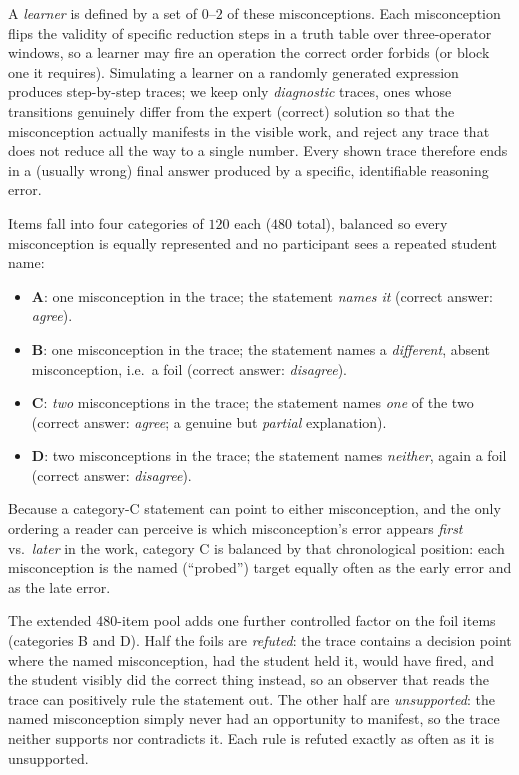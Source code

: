 \documentclass[11pt]{article}
\begin{document}
A \emph{learner} is defined by a set of $0$--$2$ of these misconceptions. Each misconception
flips the validity of specific reduction steps in a truth table over three-operator windows,
so a learner may fire an operation the correct order forbids (or block one it requires).
Simulating a learner on a randomly generated expression produces step-by-step traces; we keep
only \emph{diagnostic} traces, ones whose transitions genuinely differ from the expert
(correct) solution so that the misconception actually manifests in the visible work, and reject
any trace that does not reduce all the way to a single number. Every shown trace therefore
ends in a (usually wrong) final answer produced by a specific, identifiable reasoning error.

Items fall into four categories of $120$ each ($480$ total), balanced so every misconception is
equally represented and no participant sees a repeated student name:
\begin{itemize}
\item \textbf{A}: one misconception in the trace; the statement \emph{names it}
      (correct answer: \emph{agree}).
\item \textbf{B}: one misconception in the trace; the statement names a \emph{different},
      absent misconception, i.e.\ a foil (correct answer: \emph{disagree}).
\item \textbf{C}: \emph{two} misconceptions in the trace; the statement names \emph{one} of
      the two (correct answer: \emph{agree}; a genuine but \emph{partial} explanation).
\item \textbf{D}: two misconceptions in the trace; the statement names \emph{neither},
      again a foil (correct answer: \emph{disagree}).
\end{itemize}
Because a category-C statement can point to either misconception, and the only ordering a
reader can perceive is which misconception's error appears \emph{first} vs.\ \emph{later} in
the work, category C is balanced by that chronological position: each misconception is the
named (``probed'') target equally often as the early error and as the late error.

The extended 480-item pool adds one further controlled factor on the foil items (categories B
and D). Half the foils are \emph{refuted}: the trace contains a decision point where the named
misconception, had the student held it, would have fired, and the student visibly did the
correct thing instead, so an observer that reads the trace can positively rule the statement
out. The other half are \emph{unsupported}: the named misconception simply never had an
opportunity to manifest, so the trace neither supports nor contradicts it. Each rule is refuted
exactly as often as it is unsupported.
\end{document}
